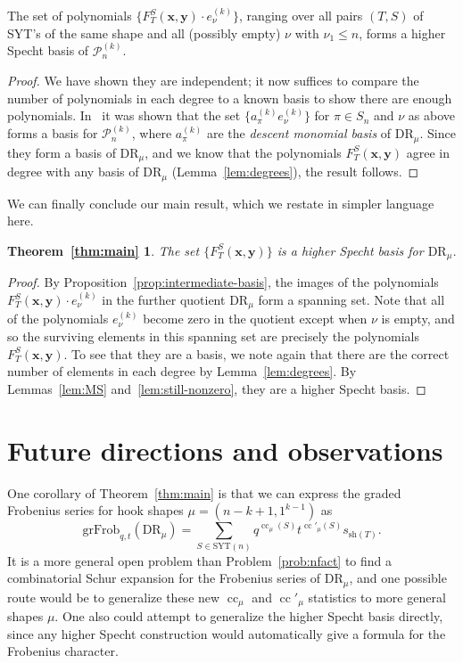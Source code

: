 \documentclass[ALCO,Unicode]{cedram}
\DeclareMathOperator{\cc}{cc}
\newcommand{\SYT}{\mathrm{SYT}}
\newcommand{\sh}{\mathrm{sh}}
\newcommand{\DR}{\mathrm{DR}}
\newcommand{\grFrob}{\mathrm{grFrob}}
\newtheorem*{MainTheorem}{Theorem~\ref{thm:main}}
\begin{document}
\begin{prop}\label{prop:intermediate-basis}
	The set of polynomials $\{F_T^S(\mathbf{x},\mathbf{y})\cdot e_\nu^{(k)}\}$, ranging over all pairs $(T,S)$ of SYT's of the same shape and all (possibly empty) $\nu$ with $\nu_1\le n$, forms a higher Specht basis of $\mathcal{P}_n^{(k)}$.
\end{prop}

\begin{proof}
	We have shown they are independent; it now suffices to compare the number of polynomials in each degree to a known basis to show there are enough polynomials.  In~\cite{HookBases} it was shown that the set $\{a_\pi^{(k)}e_\nu^{(k)}\}$ for $\pi\in S_n$ and $\nu$ as above forms a basis for $\mathcal{P}_n^{(k)}$, where  $a_\pi^{(k)}$ are the \textit{descent monomial basis} of $\DR_\mu$.  Since they form a basis of $\DR_\mu$, and we know that the polynomials $F_T^S(\mathbf{x},\mathbf{y})$ agree in degree with any basis of $\DR_\mu$ (Lemma~\ref{lem:degrees}), the result follows.
\end{proof}

We can finally conclude our main result, which we restate in simpler language here. 

\begin{MainTheorem}
	The set $\{F_T^S(\mathbf{x},\mathbf{y})\}$ is a higher Specht basis for $\DR_\mu$.
\end{MainTheorem}

\begin{proof}
	By Proposition~\ref{prop:intermediate-basis}, the images of the polynomials $F_T^S(\mathbf{x},\mathbf{y})\cdot e_\nu^{(k)}$ in the further quotient $\DR_\mu$ form a spanning set. 
	Note that all of the polynomials $e_\nu^{(k)}$ become zero in the quotient except when $\nu$ is empty, and so the surviving elements in this spanning set are precisely the polynomials $F_T^S(\mathbf{x},\mathbf{y})$.  To see that they are a basis, we note again that there are the correct number of elements in each degree by Lemma~\ref{lem:degrees}.  By Lemmas~\ref{lem:MS} and~\ref{lem:still-nonzero}, they are a higher Specht basis. 
\end{proof}



\section{Future directions and observations}\label{sec:future}

One corollary of Theorem~\ref{thm:main} is that we can express the graded Frobenius series for hook shapes $\mu=(n-k+1,1^{k-1})$ as
$$\grFrob_{q,t}(\DR_\mu)=\sum_{S\in \SYT(n)} q^{\cc_\mu(S)}t^{\cc'_\mu(S)}s_{\sh(T)}.$$
It is a more general open problem than Problem~\ref{prob:nfact} to find a combinatorial Schur expansion for the Frobenius series of $\DR_\mu$, and one possible route would be to generalize these new $\cc_\mu$ and $\cc'_\mu$ statistics to more general shapes $\mu$.  One also could attempt to generalize the higher Specht basis directly, since any higher Specht construction would automatically give a formula for the Frobenius character.
\end{document}
